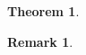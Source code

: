 \documentclass{ieeeconf}
\newtheorem{thm}{Theorem}
\newtheorem{rem}{Remark}
\begin{document}
\lipsum[2]

\begin{thm}
\lipsum*[3]
\end{thm}

\lipsum[2]

\begin{rem}
\lipsum*[3]
\end{rem}

\lipsum[4]
\end{document}
